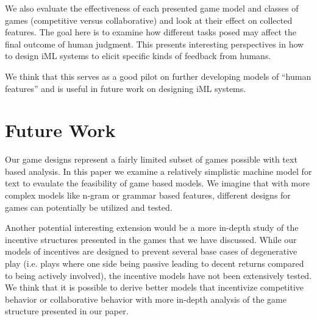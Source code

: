 \documentclass[chi_draft]{sigchi}
\begin{document}
We also evaluate the effectiveness of each presented game model and classes of games (competitive versus collaborative) and look at their effect on collected features. The goal here is to examine how different tasks posed may affect the final outcome of human judgment. This presents interesting perspectives in how to design iML systems to elicit specific kinds of feedback from humans.

We think that this serves as a good pilot on further developing models of ``human features'' and is useful in future work on designing iML systems.

\section{Future Work}
Our game designs represent a fairly limited subset of games possible with text based analysis. In this paper we examine a relatively simplistic machine model for text to evaulate the feasibility of game based models. We imagine that with more complex models like n-gram or grammar based features, different designs for games can potentially be utilized and tested.

Another potential interesting extension would be a more in-depth study of the incentive structures presented in the games that we have discussed. While our models of incentives are designed to prevent several base cases of degenerative play (i.e. plays where one side being passive leading to decent returns compared to being actively involved), the incentive models have not been extensively tested. We think that it is possible to derive better models that incentivize competitive behavior or collaborative behavior with more in-depth analysis of the game structure presented in our paper.



\end{document}
